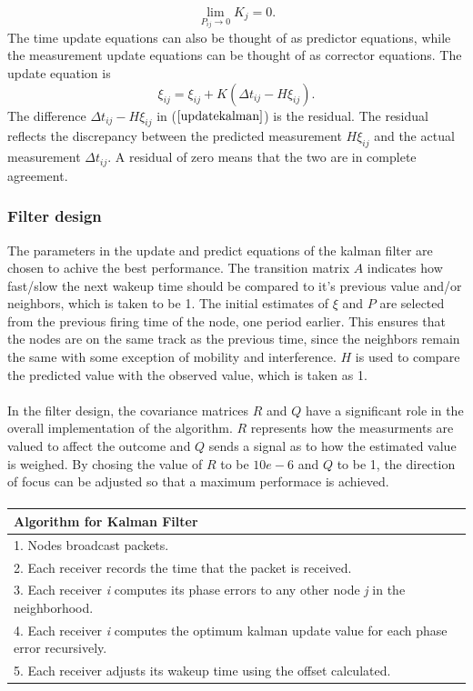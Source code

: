\documentclass[a4paper,10pt]{report}
\begin{document}
\begin{equation}
\mathop {\lim }\limits_{P_{ij} \to 0 } {K_j} = 0.
\end{equation}
The time update equations can also be thought of as predictor
equations, while the measurement update equations can be thought of
as corrector equations.
\newline
The update equation is
\begin{equation}
\xi_{ij} = \xi_{ij} + K(\Delta t_{ij}-H\xi_{ij}).
\label{updatekalman}
\end{equation}
The difference $\Delta t_{ij} - H\xi_{ij}$ in ($\ref{updatekalman}$) is the
residual. The residual reflects the discrepancy between the
predicted measurement $H\xi_{ij}$ and the actual measurement
$\Delta t_{ij}$. A residual of zero means that the two are in complete
agreement.
\subsubsection{Filter design}
The parameters in the update and predict equations of the kalman filter are chosen to achive the best performance. 
The transition matrix $A$ indicates how fast/slow the next wakeup
time should be compared to it's previous value and/or neighbors, which is taken to be 1. The
initial estimates of $\xi$ and $P$ are selected from the previous
firing time of the node, one period earlier. This ensures that the
nodes are on the same track as the previous time, since the
neighbors remain the same with some exception of mobility and
interference. $H$ is used to compare the predicted value with the
observed value, which is taken as 1. \paragraph*{} In the filter design, the covariance
matrices $R$ and $Q$ have a significant role in the overall
implementation of the algorithm. $R$ represents how the measurments
are valued to affect the outcome and $Q$ sends a signal as to how
the estimated value is weighed. By chosing the value of $R$ to be $10e-6$  and $Q$ to be 1,
the direction of focus can be adjusted so that a maximum performace is achieved.
\paragraph*{}
\begin{tabular}{  l }Algorithm for Kalman Filter \\ \hline \hline
1. Nodes broadcast packets. \\  2. Each receiver records the time that the packet is received. \\
3. Each receiver \textit{i} computes its phase errors to any other node \textit{j} in the neighborhood. \\
4. Each receiver \textit{i} computes the optimum kalman update value for each phase error recursively. \\
5. Each receiver adjusts its wakeup time using the offset calculated.\\
\hline \hline
\end{tabular}
\end{document}
